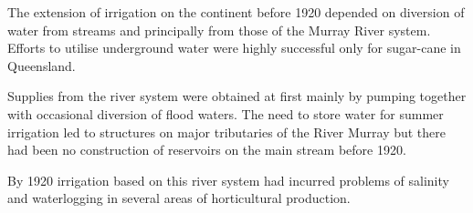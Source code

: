 The extension of irrigation on the continent before 1920 depended on
diversion of water from streams and principally from those of the
Murray River system.  Efforts to utilise underground water were highly
successful only for sugar-cane in Queensland.

Supplies from the river system were obtained at first mainly by
pumping together with occasional diversion of flood waters.  The need
to store water for summer irrigation led to structures on major
tributaries of the River Murray but there had been no construction of
reservoirs on the main stream before 1920.

By 1920 irrigation based on this river system had incurred problems of
salinity and waterlogging in several areas of horticultural
production.
